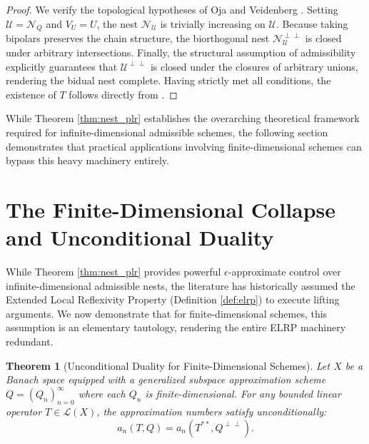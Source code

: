 \documentclass[11pt,reqno]{amsart}
\newtheorem{theorem}{Theorem}[section]
\theoremstyle{definition}
\begin{document}
\begin{proof}
We verify the topological hypotheses of Oja and Veidenberg \cite[Theorem 4.4]{OV2017}. Setting $\mathcal{U} = \mathcal{N}_Q$ and $V_U = U$, the nest $\mathcal{N}_{\mathcal{U}}$ is trivially increasing on $\mathcal{U}$. Because taking bipolars preserves the chain structure, the biorthogonal nest $\mathcal{N}_{\mathcal{U}}^{\perp\perp}$ is closed under arbitrary intersections. Finally, the structural assumption of admissibility explicitly guarantees that $\mathcal{U}^{\perp\perp}$ is closed under the closures of arbitrary unions, rendering the bidual nest complete. Having strictly met all conditions, the existence of $T$ follows directly from \cite[Theorem 4.4]{OV2017}.
\end{proof}

While Theorem \ref{thm:nest_plr} establishes the overarching theoretical framework required for infinite-dimensional admissible schemes, the following section demonstrates that practical applications involving finite-dimensional schemes can bypass this heavy machinery entirely.

\section{The Finite-Dimensional Collapse and Unconditional Duality}

While Theorem \ref{thm:nest_plr} provides powerful $\epsilon$-approximate control over infinite-dimensional admissible nests, the literature has historically assumed the Extended Local Reflexivity Property (Definition \ref{def:elrp}) to execute lifting arguments. We now demonstrate that for finite-dimensional schemes, this assumption is an elementary tautology, rendering the entire ELRP machinery redundant.

\begin{theorem}[Unconditional Duality for Finite-Dimensional Schemes] \label{thm:duality}
Let $X$ be a Banach space equipped with a generalized subspace approximation scheme $Q = (Q_n)_{n=0}^\infty$ where each $Q_n$ is finite-dimensional. For any bounded linear operator $T \in \mathcal{L}(X)$, the approximation numbers satisfy unconditionally:
\begin{equation}
a_n(T, Q) = a_n(T^{**}, Q^{\perp\perp}).
\end{equation}
\end{theorem}
\end{document}

